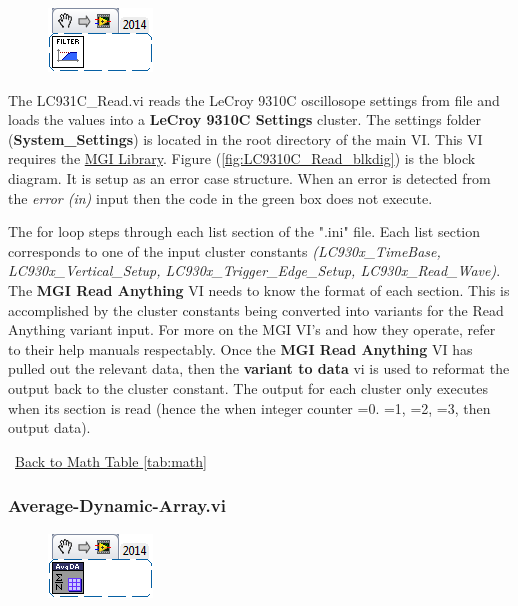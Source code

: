 \documentclass[11pt,a4paper,oldfontcommands]{memoir}
\begin{document}
\begin{figure}[h]
	\includegraphics[scale=0.625]{Filter_signal_main_01}
	\label{fig:Filter_signal_main_01}
\end{figure}

The LC931C\_Read.vi reads the LeCroy 9310C oscillosope settings from file and loads the values into a \textbf{LeCroy 9310C Settings} cluster. The settings folder (\textbf{System\_Settings}) is located in the root directory of the main VI. This VI requires the \href{http://sine.ni.com/nips/cds/view/p/lang/en/nid/209753}{MGI Library}. Figure (\ref{fig:LC9310C_Read_blkdig}) is the block diagram.  It is setup as an error case structure. When an error is detected from the \textit{error (in)} input then the code in the green box does not execute.

The for loop steps through each list section of the ".ini" file. Each list section corresponds to one of the input cluster constants \textit{(LC930x\_TimeBase, LC930x\_Vertical\_Setup, LC930x\_Trigger\_Edge\_Setup, LC930x\_Read\_Wave)}. The \textbf{MGI Read Anything} VI needs to know the format of each section. This is accomplished by the cluster constants being converted into variants for the Read Anything variant input.  For more on the MGI VI's and how they operate, refer to their help manuals respectably. Once the \textbf{MGI Read Anything} VI has pulled out the relevant data, then the \textbf{variant to data} vi is used to reformat the output back to the cluster constant. The output for each cluster only executes when its section is read (hence the when integer counter =0. =1, =2, =3, then output data).

\noindent\hrulefill\, \hyperref[tab:math]{Back to Math Table \ref{tab:math}}

\subsubsection{Average-Dynamic-Array.vi} \label{Average-Dynamic-Array}
\noindent\hrulefill

\begin{figure}[h]
	\includegraphics[scale=0.625]{Average-Dynamic-Array_main_01}
	\label{fig:Average-Dynamic-Array_main_01}
\end{figure}
\end{document}
